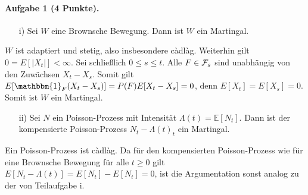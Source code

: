 \documentclass{article}
\begin{document}
\paragraph{Aufgabe 1 \textnormal{(4 Punkte)}.}
\begin{itemize}
\item [i)] Sei $W$ eine Brownsche Bewegung.
  Dann ist $W$ ein Martingal.
\end{itemize}
$W$ ist adaptiert und stetig, also insbesondere càdlàg.
Weiterhin gilt $0=E[|X_t|]<\infty$.
Sei schließlich $0\leq s\leq t$.
Alle $F\in{\cal F}_s$ sind unabhängig von den Zuwächsen $X_t-X_s$.
Somit gilt $E[\mathbbm{1}_F(X_t-X_s)]=P(F)E[X_t-X_s]=0$, denn $E[X_t]=E[X_s]=0$.
Somit ist $W$ ein Martingal.
\begin{itemize}
\item [ii)] Sei $N$ ein Poisson-Prozess mit Intensität $\Lambda(t)=\mathbb{E}[N_t]$.
  Dann ist der kompensierte Poisson-Prozess $N_t-\Lambda(t)_t$ ein Martingal.
\end{itemize}
Ein Poisson-Prozess ist càdlàg.
Da für den kompensierten Poisson-Prozess wie für eine Brownsche Bewegung für alle $t\geq0$ gilt $E[N_t-\Lambda(t)]=E[N_t]-E[N_t]=0$, ist die Argumentation sonst analog zu der von Teilaufgabe i.
\end{document}
